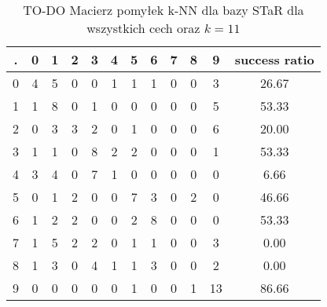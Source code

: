 \documentclass{classrepshort}
\begin{document}
\begin{table}[h!]
  \centering
  \caption{TO-DO Macierz pomyłek k-NN dla bazy STaR dla wszystkich cech oraz $k=11$}
  \label{tab:tab1}
  \begin{tabular}{|c|c|c|c|c|c|c|c|c|c|c|c|}
    \hline
	. & 0 & 1 & 2 & 3 & 4 & 5 & 6 & 7 & 8 & 9 & success ratio \\
    \hline
	0 & 4 & 5 & 0 & 0 & 1 & 1 & 1 & 0 & 0 & 3 & 26.67\\
    \hline
	1 & 1 & 8 & 0 & 1 & 0 & 0 & 0 & 0 & 0 & 5 & 53.33\\
	\hline
	2 & 0 & 3 & 3 & 2 & 0 & 1 & 0 & 0 & 0 & 6 & 20.00\\
	\hline
	3 & 1 & 1 & 0 & 8 & 2 & 2 & 0 & 0 & 0 & 1 & 53.33\\
	\hline
	4 & 3 & 4 & 0 & 7 & 1 & 0 & 0 & 0 & 0 & 0 & 6.66\\
	\hline
	5 & 0 & 1 & 2 & 0 & 0 & 7 & 3 & 0 & 2 & 0 & 46.66\\
	\hline
	6 & 1 & 2 & 2 & 0 & 0 & 2 & 8 & 0 & 0 & 0 & 53.33\\
	\hline
	7 & 1 & 5 & 2 & 2 & 0 & 1 & 1 & 0 & 0 & 3 & 0.00\\
	\hline
	8 & 1 & 3 & 0 & 4 & 1 & 1 & 3 & 0 & 0 & 2 & 0.00\\
	\hline
	9 & 0 & 0 & 0 & 0 & 0 & 1 & 0 & 0 & 1 & 13 & 86.66\\    
    \hline
  \end{tabular}
\end{table} 
\end{document}
